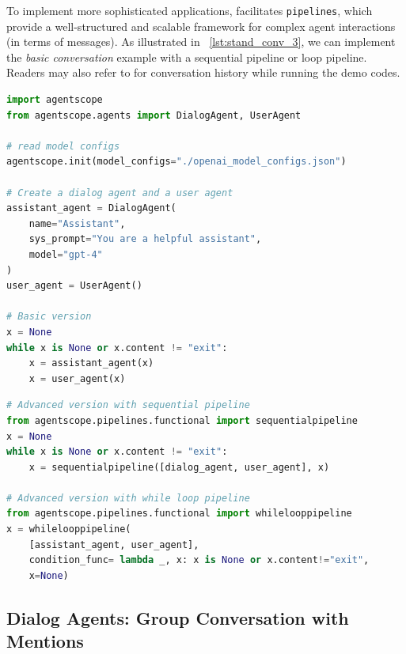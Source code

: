 To implement more sophisticated applications, \ours facilitates \texttt{pipelines}, which provide a well-structured and scalable framework for complex agent interactions (in terms of messages). As illustrated in \lstlistingname~\ref{lst:stand_conv_3}, we can implement the \textit{basic conversation} example with a sequential pipeline or loop pipeline. Readers may also refer to  for conversation history while running the demo codes.

\begin{lstlisting}[language=Python, caption={Code example of the basic conversation example.}, label={lst:stand_conv_1}, float=t]
import agentscope
from agentscope.agents import DialogAgent, UserAgent

# read model configs
agentscope.init(model_configs="./openai_model_configs.json")

# Create a dialog agent and a user agent
assistant_agent = DialogAgent(
    name="Assistant",
    sys_prompt="You are a helpful assistant",
    model="gpt-4"
)
user_agent = UserAgent()

# Basic version
x = None
while x is None or x.content != "exit":
    x = assistant_agent(x)
    x = user_agent(x)
\end{lstlisting}

\begin{lstlisting}[language=Python, caption={Pipeline-based implementation of the basic conversation example.}, label={lst:stand_conv_3}, float=h]
# Advanced version with sequential pipeline
from agentscope.pipelines.functional import sequentialpipeline
x = None
while x is None or x.content != "exit":
    x = sequentialpipeline([dialog_agent, user_agent], x)

# Advanced version with while loop pipeline
from agentscope.pipelines.functional import whilelooppipeline
x = whilelooppipeline(
    [assistant_agent, user_agent], 
    condition_func= lambda _, x: x is None or x.content!="exit", 
    x=None)
\end{lstlisting}


\subsection{Dialog Agents: Group Conversation with Mentions}

